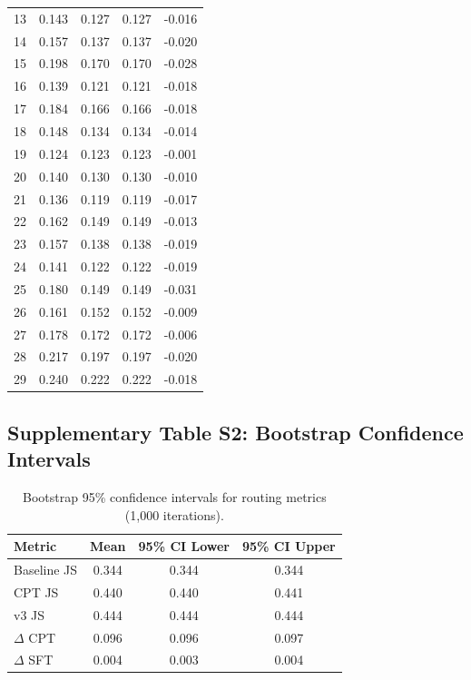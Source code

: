 \documentclass[11pt]{article}
\begin{document}
\begin{longtable}{lcccc}
13 & 0.143 & 0.127 & 0.127 & -0.016 \\
14 & 0.157 & 0.137 & 0.137 & -0.020 \\
15 & 0.198 & 0.170 & 0.170 & -0.028 \\
16 & 0.139 & 0.121 & 0.121 & -0.018 \\
17 & 0.184 & 0.166 & 0.166 & -0.018 \\
18 & 0.148 & 0.134 & 0.134 & -0.014 \\
19 & 0.124 & 0.123 & 0.123 & -0.001 \\
20 & 0.140 & 0.130 & 0.130 & -0.010 \\
21 & 0.136 & 0.119 & 0.119 & -0.017 \\
22 & 0.162 & 0.149 & 0.149 & -0.013 \\
23 & 0.157 & 0.138 & 0.138 & -0.019 \\
24 & 0.141 & 0.122 & 0.122 & -0.019 \\
25 & 0.180 & 0.149 & 0.149 & -0.031 \\
26 & 0.161 & 0.152 & 0.152 & -0.009 \\
27 & 0.178 & 0.172 & 0.172 & -0.006 \\
28 & 0.217 & 0.197 & 0.197 & -0.020 \\
29 & 0.240 & 0.222 & 0.222 & -0.018 \\
\end{longtable}

\subsection{Supplementary Table S2: Bootstrap Confidence Intervals}

\begin{table}[H]
\centering
\caption{Bootstrap 95\% confidence intervals for routing metrics (1,000 iterations).}
\begin{tabular}{lccc}
\toprule
\textbf{Metric} & \textbf{Mean} & \textbf{95\% CI Lower} & \textbf{95\% CI Upper} \\
\midrule
Baseline JS & 0.344 & 0.344 & 0.344 \\
CPT JS & 0.440 & 0.440 & 0.441 \\
v3 JS & 0.444 & 0.444 & 0.444 \\
$\Delta$ CPT & 0.096 & 0.096 & 0.097 \\
$\Delta$ SFT & 0.004 & 0.003 & 0.004 \\
\bottomrule
\end{tabular}
\end{table}
\end{document}
